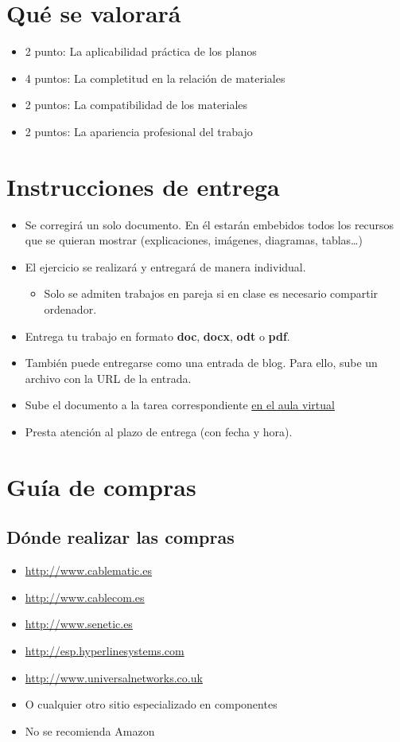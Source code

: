 \documentclass[a4paper]{article}
\begin{document}
\section{Qué se valorará}
\label{sec:org0000009}
\begin{itemize}
\item 2 punto: La aplicabilidad práctica de los planos
\item 4 puntos: La completitud en la relación de materiales
\item 2 puntos: La compatibilidad de los materiales
\item 2 puntos: La apariencia profesional del trabajo
\end{itemize}


\section{Instrucciones de entrega}
\label{sec:org000000c}
\begin{itemize}
\item Se corregirá un solo documento. En él estarán embebidos todos los recursos que se quieran mostrar (explicaciones, imágenes, diagramas, tablas\ldots{})
\item El ejercicio se realizará y entregará de manera individual.
\begin{itemize}
\item Solo se admiten trabajos en pareja si en clase es necesario compartir ordenador.
\end{itemize}
\item Entrega tu trabajo en formato \textbf{doc}, \textbf{docx}, \textbf{odt} o \textbf{pdf}.
\item También puede entregarse como una entrada de blog. Para ello, sube un archivo con la URL de la entrada.
\item Sube el documento a la tarea correspondiente \href{https://aulavirtual3.educa.madrid.org/ies.alonsodeavellan.alcala}{en el aula virtual}
\item Presta atención al plazo de entrega (con fecha y hora).
\end{itemize}



\section{Guía de compras}
\label{sec:org0000018}
\subsection{Dónde realizar las compras}
\label{sec:org000000f}
\begin{itemize}
\item \url{http://www.cablematic.es}
\item \url{http://www.cablecom.es}
\item \url{http://www.senetic.es}
\item \url{http://esp.hyperlinesystems.com}
\item \url{http://www.universalnetworks.co.uk}
\item O cualquier otro sitio especializado en componentes
\item No se recomienda Amazon
\end{itemize}
\end{document}
